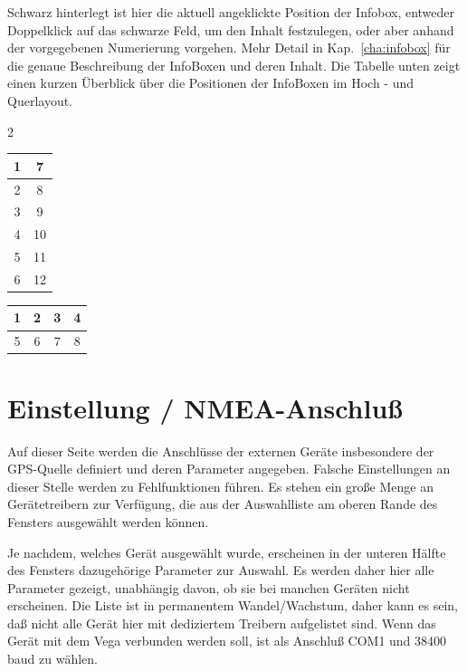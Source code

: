
Schwarz hinterlegt ist hier die aktuell angeklickte Position der Infobox, entweder Doppelklick auf das schwarze Feld, um
den Inhalt festzulegen, oder aber anhand der vorgegebenen Numerierung vorgehen. Mehr Detail in Kap.~\ref{cha:infobox} für die genaue Beschreibung der InfoBoxen und deren Inhalt.
Die Tabelle unten zeigt einen kurzen Überblick über die Positionen der InfoBoxen im Hoch - und Querlayout.
\begin{center}\begin{multicols}{2}
\begin{tabular}{|c|c|}
\hline
1 & 7 \\
\hline
2 & 8 \\
\hline
3 & 9 \\
\hline
4 & 10 \\
\hline
5 & 11 \\
\hline
6 & 12 \\
\hline
\end{tabular}

\begin{tabular}{|c|c|c|c|}
\hline
1 & 2 & 3 & 4 \\
\hline
\hline
5 & 6 & 7 & 8 \\
\hline
\end{tabular}
\end{multicols}
\end{center}


\section{Einstellung / NMEA-Anschluß} \label{conf:comdevices}

Auf dieser Seite werden die Anschlüsse der externen Geräte insbesondere der GPS-Quelle definiert und deren Parameter
angegeben. Falsche Einstellungen an dieser Stelle werden zu Fehlfunktionen führen. Es stehen ein große Menge an Gerätetreibern zur Verfügung, die aus der Auswahlliste am
oberen Rande des Fensters ausgewählt werden können.

Je nachdem, welches Gerät ausgewählt wurde, erscheinen in der unteren Hälfte des Fensters dazugehörige
Parameter zur Auswahl. \achtung Es werden daher hier alle Parameter gezeigt, unabhängig davon, ob sie bei manchen Geräten nicht erscheinen.
Die Liste ist in permanentem Wandel/Wachstum, daher kann es sein, daß nicht alle Gerät hier mit dediziertem Treibern aufgelistet sind.
Wenn das Gerät mit dem Vega verbunden werden soll, ist als Anschluß COM1 und 38400 baud zu wählen.

